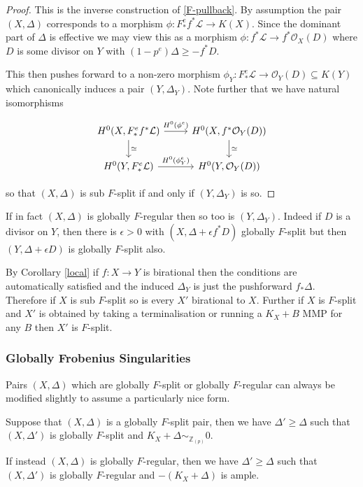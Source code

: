 \documentclass[a4paper,12pt]{book}
\newcommand{\ox}[1][X]{\mathcal{O}_{#1}}
\newcommand{\zp}{\mathbb{Z}_{(p)}}
\begin{document}
\begin{proof}
	
	This is the inverse construction of \autoref{F-pullback}. By assumption the pair $(X,\Delta)$ corresponds to a morphism $\phi:F_{*}^{e}f^{*}\mathcal{L} \to K(X)$. Since the dominant part of $\Delta$ is effective we may view this as a morphism $\phi: f^{*}\mathcal{L} \to f^{*}\ox(D)$ where $D$ is some divisor on $Y$ with $(1-p^{e}) \Delta \geq -f^{*}D$.
	
	This then pushes forward to a non-zero morphism $\phi_{Y}:F_{*}^{e}\mathcal{L} \to \ox[Y](D) \subseteq K(Y)$ which canonically induces a pair $(Y,\Delta_{Y})$. Note further that we have natural isomorphisms

	\[\begin{tikzcd}
	{H^{0}(X,F_{*}^{e}f^{*}\mathcal{L})} \arrow[r, "H^{0}(\phi^{e})"] \arrow[d, "\simeq "] & {H^{0}(X,f^{*}\ox[Y](D))} \arrow[d, "\simeq"] \\
	{H^{0}(Y,F_{*}^{e}\mathcal{L})} \arrow[r, "H^{0}(\phi_{Y}^{e})"]                       & {H^{0}(Y,\ox[Y](D))}                         
	\end{tikzcd}\]
	
	so that $(X,\Delta)$ is sub $F$-split if and only if $(Y,\Delta_{Y})$ is so.	
\end{proof}

If in fact $(X,\Delta)$ is globally $F$-regular then so too is $(Y,\Delta_{Y})$. Indeed if $D$ is a divisor on $Y$, then there is $\epsilon > 0$ with $(X,\Delta+\epsilon f^{*}D)$ globally $F$-split but then $(Y,\Delta+\epsilon D)$ is globally $F$-split also.

By Corollary \ref{local} if $f:X \to Y$ is birational then the conditions are automatically satisfied and the induced $\Delta_{Y}$ is just the pushforward $f_{*}\Delta$. Therefore if $X$ is sub $F$-split so is every $X'$ birational to $X$. Further if $X$ is $F$-split and $X'$ is obtained by taking a terminalisation or running a $K_{X}+B$ MMP for any $B$ then $X'$ is $F$-split.

\subsubsection{Globally Frobenius Singularities}

Pairs $(X,\Delta)$ which are globally $F$-split or globally $F$-regular can always be modified slightly to assume a particularly nice form.

\begin{lemma}
	
	Suppose that $(X,\Delta)$ is a globally $F$-split pair, then we have $\Delta' \geq \Delta$ such that $(X,\Delta')$ is globally $F$-split and $K_{X}+\Delta \sim_{\zp} 0 $.
	
	If instead $(X,\Delta)$ is globally $F$-regular, then we have $\Delta' \geq \Delta$ such that $(X,\Delta')$ is globally $F$-regular and $-(K_{X}+\Delta)$ is ample.
	
	\end{lemma}
\end{document}
